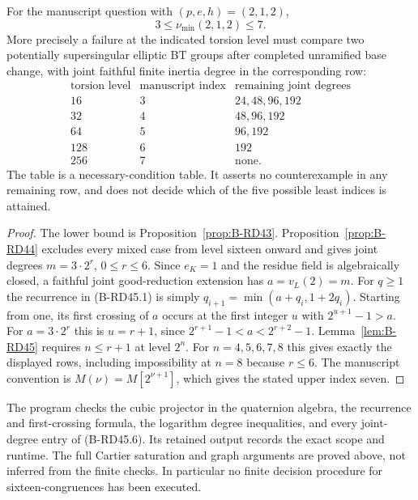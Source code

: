 \begin{theorem}
\label{thm:B-RD45}
For the manuscript question with $(p,e,h)=(2,1,2)$,
\[
                         3\le\nu_{\min}(2,1,2)\le7.
 \tag{B-RD45.5}
\]
More precisely a failure at the indicated torsion level must
compare two potentially supersingular elliptic BT groups after
completed unramified base change, with joint faithful finite
inertia degree in the corresponding row:
\[
\begin{array}{c|c|c}
\text{torsion level}&\text{manuscript index}&\text{remaining joint degrees}\\
\hline
16&3&24,48,96,192\\
32&4&48,96,192\\
64&5&96,192\\
128&6&192\\
256&7&\text{none}.
\end{array}
 \tag{B-RD45.6}
\]
The table is a necessary-condition table. It asserts no
counterexample in any remaining row, and does not decide
which of the five possible least indices is attained.
\end{theorem}
\begin{proof}
The lower bound is Proposition~\ref{prop:B-RD43}.
Proposition~\ref{prop:B-RD44} excludes every mixed case from
level sixteen onward and gives joint degrees $m=3\cdot2^r$,
$0\le r\le6$. Since $e_K=1$ and the residue field is algebraically
closed, a faithful joint good-reduction extension has
$a=v_L(2)=m$.
For $q\ge1$ the recurrence in (B-RD45.1) is simply
$q_{i+1}=\min(a+q_i,1+2q_i)$.
Starting from one, its first crossing of $a$ occurs at the
first integer $u$ with $2^{u+1}-1>a$.
For $a=3\cdot2^r$ this is $u=r+1$, since
$2^{r+1}-1<a<2^{r+2}-1$.
Lemma~\ref{lem:B-RD45} requires $n\le r+1$ at level $2^n$.
For $n=4,5,6,7,8$ this gives exactly the displayed rows,
including impossibility at $n=8$ because $r\le6$.
The manuscript convention is $M(\nu)=M[2^{\nu+1}]$, which
gives the stated upper index seven.
\end{proof}

\begin{remark}
The program 
checks the cubic projector in the quaternion algebra, the
recurrence and first-crossing formula, the logarithm degree
inequalities, and every joint-degree entry of (B-RD45.6).
Its retained output records the exact scope and runtime.
The full Cartier saturation and graph arguments are proved
above, not inferred from the finite checks. In particular
no finite decision procedure for sixteen-congruences has
been executed.
\end{remark}
